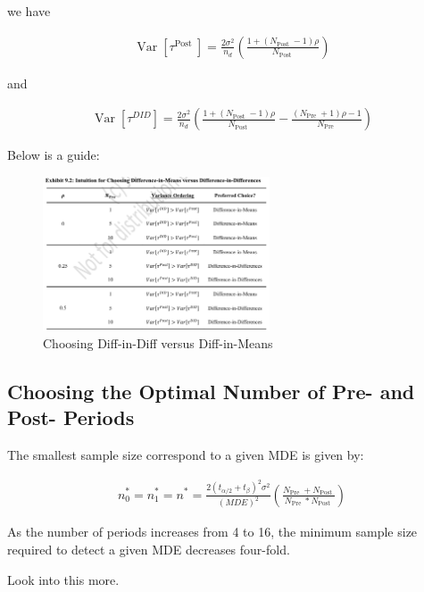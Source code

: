 \documentclass[10pt]{article}
\begin{document}
we have 

\begin{align}
    \operatorname{Var}\left[\tau^{\text {Post }}\right]=\frac{2 \sigma^2}{n_d}\left(\frac{1+\left(N_{\text {Post }}-1\right) \rho}{N_{\text {Post }}}\right)
\end{align}

and 

\begin{align}
    \operatorname{Var}\left[\tau^{D I D}\right]=\frac{2 \sigma^2}{n_d}\left(\frac{1+\left(N_{\text {Post }}-1\right) \rho}{N_{\text {Post }}}-\frac{\left(N_{\text {Pre }}+1\right) \rho-1}{N_{\text {Pre }}}\right)
\end{align}

Below is a guide:

\begin{figure}[!htb]
    \centering
        \includegraphics[width=0.6\textwidth]{../input/simple_mean_v_diff_diff.png}
    \caption{Choosing Diff-in-Diff versus Diff-in-Means}
\end{figure}

\subsection{Choosing the Optimal Number of Pre- and Post- Periods}

The smallest sample size correspond to a 
given MDE is given by:

\begin{align}
    n_0^*=n_1^*=n^*=\frac{2\left(t_{\alpha / 2}+t_\beta\right)^2 \sigma^2}{(M D E)^2}\left(\frac{N_{\text {Pre }}+N_{\text {Post }}}{N_{\text {Pre }} * N_{\text {Post }}}\right)
\end{align}

As the number of periods increases from 4 to 16, the 
minimum sample size required to detect a given MDE
decreases four-fold.

\begin{questions}
    Look into this more.
\end{questions}
\end{document}
